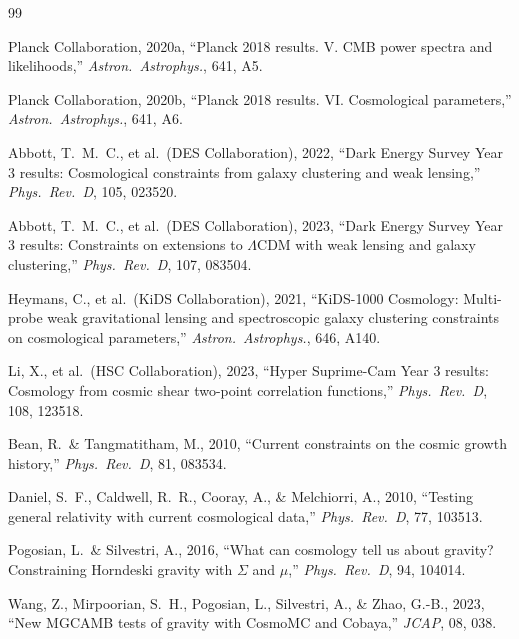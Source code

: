 \documentclass[11pt]{article}
\begin{document}

\begin{thebibliography}{99}

Planck Collaboration, 2020a, ``Planck 2018 results. V. CMB power spectra and likelihoods,'' \textit{Astron.\ Astrophys.}, 641, A5.

Planck Collaboration, 2020b, ``Planck 2018 results. VI. Cosmological parameters,'' \textit{Astron.\ Astrophys.}, 641, A6.

Abbott, T.~M.~C., et al.\ (DES Collaboration), 2022, ``Dark Energy Survey Year 3 results: Cosmological constraints from galaxy clustering and weak lensing,'' \textit{Phys.\ Rev.\ D}, 105, 023520.

Abbott, T.~M.~C., et al.\ (DES Collaboration), 2023, ``Dark Energy Survey Year 3 results: Constraints on extensions to $\Lambda$CDM with weak lensing and galaxy clustering,'' \textit{Phys.\ Rev.\ D}, 107, 083504.

Heymans, C., et al.\ (KiDS Collaboration), 2021, ``KiDS-1000 Cosmology: Multi-probe weak gravitational lensing and spectroscopic galaxy clustering constraints on cosmological parameters,'' \textit{Astron.\ Astrophys.}, 646, A140.

Li, X., et al.\ (HSC Collaboration), 2023, ``Hyper Suprime-Cam Year 3 results: Cosmology from cosmic shear two-point correlation functions,'' \textit{Phys.\ Rev.\ D}, 108, 123518.

Bean, R.\ \& Tangmatitham, M., 2010, ``Current constraints on the cosmic growth history,'' \textit{Phys.\ Rev.\ D}, 81, 083534.

Daniel, S.~F., Caldwell, R.~R., Cooray, A., \& Melchiorri, A., 2010, ``Testing general relativity with current cosmological data,'' \textit{Phys.\ Rev.\ D}, 77, 103513.

Pogosian, L.\ \& Silvestri, A., 2016, ``What can cosmology tell us about gravity? Constraining Horndeski gravity with $\Sigma$ and $\mu$,'' \textit{Phys.\ Rev.\ D}, 94, 104014.

Wang, Z., Mirpoorian, S.~H., Pogosian, L., Silvestri, A., \& Zhao, G.-B., 2023, ``New MGCAMB tests of gravity with CosmoMC and Cobaya,'' \textit{JCAP}, 08, 038.


\end{thebibliography}
\end{document}
